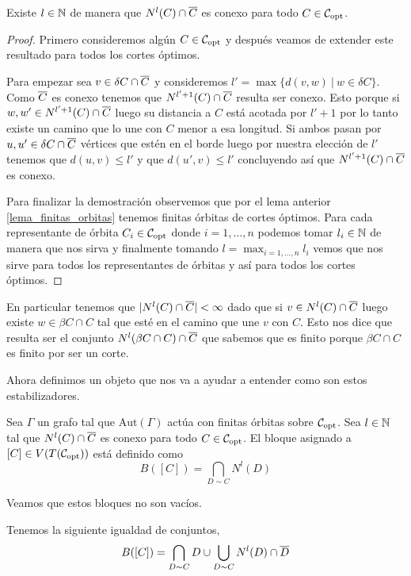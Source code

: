 \documentclass[tesis.tex]{subfiles}
\newcommand{\aut}{\text{Aut}}
\begin{document}
\begin{lema}\label{lema_nlC_cap_olC_conexo}
	Existe $l \in \mathbb{N}$ de manera que $N^l(C) \cap \overline C$ es conexo para todo $C \in {\cal C}_{\text{opt}}$.
\end{lema}
\begin{proof}
	Primero consideremos algún $C \in {\cal C}_{\text{opt}}$ y después veamos de extender este resultado para todos los cortes óptimos.
	
	Para empezar sea $v \in \delta C \cap \overline C$ y consideremos $l' = \max  \{d(v,w) \ | \ w \in \delta C\}$.
	Como $\overline C$ es conexo tenemos que $N^{l'+1}(C) \cap \overline C$ resulta ser conexo.
	Esto porque si $w,w' \in N^{l'+1}(C) \cap \overline C$ luego su distancia a $C$ está acotada por $l'+1$ por lo tanto existe un camino que lo une con $C$ menor a esa longitud.
	Si ambos pasan por $u,u' \in \delta C \cap \overline C$ vértices que estén en el borde luego por nuestra elección de $l'$ tenemos que $d(u,v) \le l'$ y que $d(u',v) \le l'$ concluyendo así que $N^{l'+1}(C) \cap \overline C$ es conexo.
	
	Para finalizar la demostración observemos que por el lema anterior \ref{lema_finitas_orbitas} tenemos finitas órbitas de cortes óptimos.
	Para cada representante de órbita $C_i \in {\cal C}_{\text{opt}}$ donde $i=1,\dots,n$ podemos tomar $l_i \in \mathbb{N}$ de manera que nos sirva y finalmente tomando $l = \max_{i=1,\dots,n} l_i$ vemos que nos sirve para todos los representantes de órbitas y así para todos los cortes óptimos.
\end{proof}
\begin{obs}
	En particular tenemos que $|N^l(C) \cap \overline C|<\infty$ dado que si $v \in N^l(C) \cap \overline C$ luego existe $w \in \beta C \cap C$ tal que esté en el camino que une $v$ con $C$.
	Esto nos dice que resulta ser el conjunto $N^l(\beta C  \cap C) \cap \overline C$ que sabemos que es finito porque $\beta C \cap C$ es finito por ser un corte.
\end{obs}
Ahora definimos un objeto que nos va a ayudar a entender como son estos estabilizadores.

\begin{deff}
	Sea $\Gamma$ un grafo tal que $\aut(\Gamma)$ actúa con finitas órbitas sobre ${\cal C}_{\text{opt}}$.
	Sea $l \in \mathbb{N}$ tal que $N^l(C) \cap \overline C$ es conexo para todo $C \in {\cal C}_{\text{opt}}$.
	El bloque asignado a $[C] \in V(T({\cal C}_{\text{opt}}))$ está definido como
	\[
		B([C]) = \bigcap_{D \sim C} N^l (D)
	\]	
\end{deff}

Veamos que estos bloques no son vacíos.

\begin{lema}
	Tenemos la siguiente igualdad de conjuntos,
	\[
		B([C]) = \bigcap_{D \sim C} D \cup \bigcup_{D \sim C} N^l(D) \cap \overline D
	\]
\end{lema}
\end{document}
